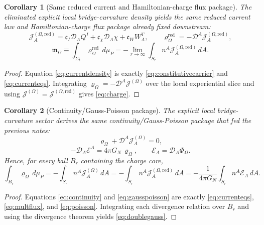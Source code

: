 \documentclass[11pt]{article}
\newcommand{\SpatialD}{\mathcal D}
\newcommand{\FlowPot}{\Phi_\Omega}
\newcommand{\SourceDensity}{\varrho_\Omega}
\newcommand{\SourceDensityRed}{\varrho_\Omega^{\mathrm{red}}}
\newcommand{\SourceCurrent}{\mathcal J^{(\Omega)}}
\newcommand{\SourceCurrentRed}{\mathcal J^{(\Omega,\mathrm{red})}}
\newcommand{\SourceFlux}{\mathcal E}
\newcommand{\HamChargeOmega}{\mathfrak m_\Omega}
\newtheorem{corollary}{Corollary}
\begin{document}
\begin{corollary}[Same reduced current and Hamiltonian-charge flux package]
\label{cor:currentflux}
The eliminated explicit local bridge-curvature density yields the same reduced current law and Hamiltonian-charge flux package already fixed downstream:
\begin{equation}
\SourceCurrentRed_A
=
\mathfrak c_I\SpatialD_AQ^I
+\mathfrak c_\chi\SpatialD_A\chi
+\mathfrak c_WW_A^T,
\qquad
\SourceDensityRed=-\SpatialD^A\SourceCurrentRed_A,
\label{eq:currentdensity}
\end{equation}
\begin{equation}
\HamChargeOmega
\equiv
\int_{\Sigma_t}\SourceDensityRed\,d\mu_P
=
-\lim_{r\to\infty}\int_{S_r}n^A\SourceCurrentRed_A\,dA.
\label{eq:charge}
\end{equation}
\end{corollary}

\begin{proof}
Equation \eqref{eq:currentdensity} is exactly \eqref{eq:constitutivecarrier} and \eqref{eq:currenteqs}. Integrating \(\SourceDensity=-\SpatialD^A\SourceCurrent\) over the local experiential slice and using \(\SourceCurrent=\SourceCurrentRed\) gives \eqref{eq:charge}.
\end{proof}

\begin{corollary}[Continuity/Gauss-Poisson package]
\label{cor:continuity}
The explicit local bridge-curvature sector derives the same continuity/Gauss-Poisson package that fed the previous notes:
\begin{equation}
\SourceDensity+\SpatialD^A\SourceCurrent_A=0,
\label{eq:continuity}
\end{equation}
\begin{equation}
-\SpatialD_A\SourceFlux^A=4\pi G_N\,\SourceDensity,
\qquad
\SourceFlux_A=\SpatialD_A\FlowPot.
\label{eq:gausspoisson}
\end{equation}
Hence, for every ball \(B_r\) containing the charge core,
\begin{equation}
\int_{B_r}\SourceDensity\,d\mu_P
=
-\int_{S_r}n^A\SourceCurrent_A\,dA
=
-\int_{S_r}n^A\SourceCurrentRed_A\,dA
=
-\frac{1}{4\pi G_N}\int_{S_r}n^A\SourceFlux_A\,dA.
\label{eq:doublegauss}
\end{equation}
\end{corollary}

\begin{proof}
Equations \eqref{eq:continuity} and \eqref{eq:gausspoisson} are exactly \eqref{eq:currenteqs}, \eqref{eq:multflux}, and \eqref{eq:poisson}. Integrating each divergence relation over \(B_r\) and using the divergence theorem yields \eqref{eq:doublegauss}.
\end{proof}
\end{document}
